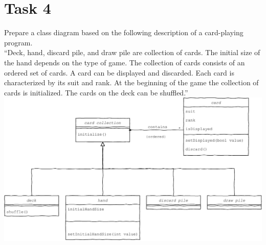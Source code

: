 \documentclass[12pt]{article}
\begin{document}
\section{Task 4}
Prepare a class diagram based on the following description of a card-playing program. 
\\
“Deck, hand, discard pile, and draw pile are collection of cards. The initial size of the hand depends on the type of game. The collection of cards consists of an ordered set of cards. A card can be displayed and discarded. Each card is characterized by its suit and rank. At the beginning of the game the collection of cards is initialized. The cards on the deck can be shuffled.” 
\\
\includegraphics[width=\textwidth]{5.pdf}
\end{document}
